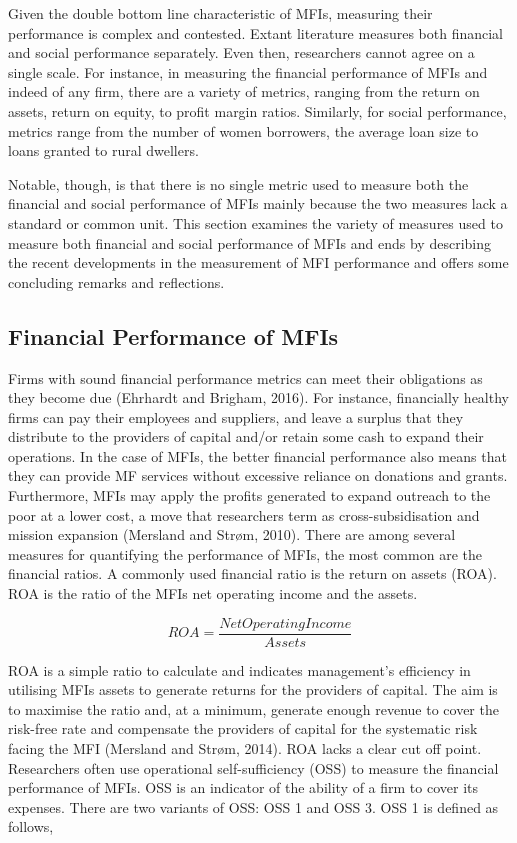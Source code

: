 \documentclass[a4paper, nobind]{templates/ociamthesis}
\begin{document}
\noindent Given the double bottom line characteristic of MFIs, measuring their performance is complex and contested. Extant literature measures both financial and social performance separately. Even then, researchers cannot agree on a single scale. For instance, in measuring the financial performance of MFIs and indeed of any firm, there are a variety of metrics, ranging from the return on assets, return on equity, to profit margin ratios. Similarly, for social performance, metrics range from the number of women borrowers, the average loan size to loans granted to rural dwellers.

Notable, though, is that there is no single metric used to measure both the financial and social performance of MFIs mainly because the two measures lack a standard or common unit. This section examines the variety of measures used to measure both financial and social performance of MFIs and ends by describing the recent developments in the measurement of MFI performance and offers some concluding remarks and reflections.

\hypertarget{financial-performance-of-mfis}{%
\subsection{Financial Performance of MFIs}\label{financial-performance-of-mfis}}

\noindent Firms with sound financial performance metrics can meet their obligations as they become due (Ehrhardt and Brigham, 2016). For instance, financially healthy firms can pay their employees and suppliers, and leave a surplus that they distribute to the providers of capital and/or retain some cash to expand their operations. In the case of MFIs, the better financial performance also means that they can provide MF services without excessive reliance on donations and grants. Furthermore, MFIs may apply the profits generated to expand outreach to the poor at a lower cost, a move that researchers term as cross-subsidisation and mission expansion (Mersland and Strøm, 2010). There are among several measures for quantifying the performance of MFIs, the most common are the financial ratios.
A commonly used financial ratio is the return on assets (ROA). ROA is the ratio of the MFIs net operating income and the assets.

\begin{equation}
ROA = \frac{Net Operating Income}{Assets}
\end{equation}

ROA is a simple ratio to calculate and indicates management's efficiency in utilising MFIs assets to generate returns for the providers of capital. The aim is to maximise the ratio and, at a minimum, generate enough revenue to cover the risk-free rate and compensate the providers of capital for the systematic risk facing the MFI (Mersland and Strøm, 2014). ROA lacks a clear cut off point. Researchers often use operational self-sufficiency (OSS) to measure the financial performance of MFIs. OSS is an indicator of the ability of a firm to cover its expenses. There are two variants of OSS: OSS 1 and OSS 3. OSS 1 is defined as follows,
\end{document}
